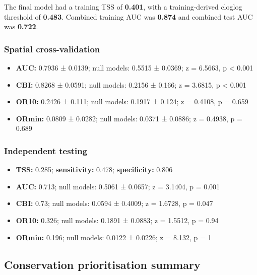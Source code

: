 \documentclass[
  openany]{book}
\providecommand{\tightlist}{%
  \setlength{\itemsep}{0pt}\setlength{\parskip}{0pt}}
\providecommand{\tightlist}{%
  \setlength{\itemsep}{0pt}%
  \setlength{\parskip}{0pt}%
}
\begin{document}
The final model had a training TSS of \textbf{0.401}, with a training-derived cloglog threshold of \textbf{0.483}. Combined training AUC was \textbf{0.874} and combined test AUC was \textbf{0.722}.

\subsubsection*{Spatial cross-validation}\label{spatial-cross-validation-7}

\begin{itemize}
\tightlist
\item
  \textbf{AUC:} 0.7936 ± 0.0139; null models: 0.5515 ± 0.0369; z = 6.5663, p \textless{} 0.001
\item
  \textbf{CBI:} 0.8268 ± 0.0591; null models: 0.2156 ± 0.166; z = 3.6815, p \textless{} 0.001
\item
  \textbf{OR10:} 0.2426 ± 0.111; null models: 0.1917 ± 0.124; z = 0.4108, p = 0.659
\item
  \textbf{ORmin:} 0.0809 ± 0.0282; null models: 0.0371 ± 0.0886; z = 0.4938, p = 0.689
\end{itemize}

\subsubsection*{Independent testing}\label{independent-testing-7}

\begin{itemize}
\tightlist
\item
  \textbf{TSS:} 0.285; \textbf{sensitivity:} 0.478; \textbf{specificity:} 0.806
\item
  \textbf{AUC:} 0.713; null models: 0.5061 ± 0.0657; z = 3.1404, p = 0.001
\item
  \textbf{CBI:} 0.73; null models: 0.0594 ± 0.4009; z = 1.6728, p = 0.047
\item
  \textbf{OR10:} 0.326; null models: 0.1891 ± 0.0883; z = 1.5512, p = 0.94
\item
  \textbf{ORmin:} 0.196; null models: 0.0122 ± 0.0226; z = 8.132, p = 1
\end{itemize}

\subsection*{Conservation prioritisation summary}\label{conservation-prioritisation-summary-7}
\end{document}
